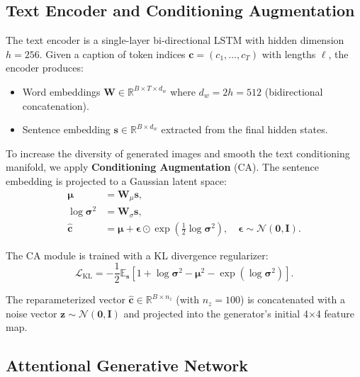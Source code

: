 \documentclass[conference]{IEEEtran}
\begin{document}
\subsection{Text Encoder and Conditioning Augmentation}
\label{sec:ca}

The text encoder is a single-layer bi-directional LSTM with hidden dimension $h=256$. Given a caption of token indices $\mathbf{c} = (c_1, \dots, c_T)$ with lengths $\ell$, the encoder produces:
\begin{itemize}
    \item Word embeddings $\mathbf{W} \in \mathbb{R}^{B \times T \times d_w}$ where $d_w = 2h = 512$ (bidirectional concatenation).
    \item Sentence embedding $\mathbf{s} \in \mathbb{R}^{B \times d_w}$ extracted from the final hidden states.
\end{itemize}

To increase the diversity of generated images and smooth the text conditioning manifold, we apply \textbf{Conditioning Augmentation} (CA). The sentence embedding is projected to a Gaussian latent space:
\begin{align}
    \boldsymbol{\mu} &= \mathbf{W}_\mu \mathbf{s}, \\
    \log \boldsymbol{\sigma}^2 &= \mathbf{W}_\sigma \mathbf{s}, \\
    \hat{\mathbf{c}} &= \boldsymbol{\mu} + \boldsymbol{\epsilon} \odot \exp(\tfrac{1}{2}\log \boldsymbol{\sigma}^2), \quad \boldsymbol{\epsilon} \sim \mathcal{N}(\mathbf{0}, \mathbf{I}).
\end{align}

The CA module is trained with a KL divergence regularizer:
\begin{equation}
    \mathcal{L}_{\text{KL}} = -\frac{1}{2} \mathbb{E}_{\mathbf{s}} \left[ 1 + \log \boldsymbol{\sigma}^2 - \boldsymbol{\mu}^2 - \exp(\log \boldsymbol{\sigma}^2) \right].
\end{equation}

The reparameterized vector $\hat{\mathbf{c}} \in \mathbb{R}^{B \times n_z}$ (with $n_z=100$) is concatenated with a noise vector $\mathbf{z} \sim \mathcal{N}(\mathbf{0}, \mathbf{I})$ and projected into the generator's initial 4$\times$4 feature map.

\subsection{Attentional Generative Network}
\label{sec:generator}
\end{document}
